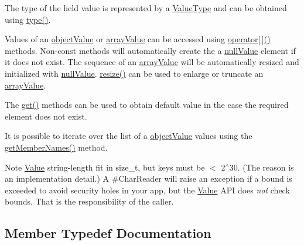 The type of the held value is represented by a \hyperlink{namespaceJson_a7d654b75c16a57007925868e38212b4e}{Value\+Type} and can be obtained using \hyperlink{classJson_1_1Value_a695ef31fad36b4712918b3ff80158479}{type()}.

Values of an \hyperlink{namespaceJson_a7d654b75c16a57007925868e38212b4eae8386dcfc36d1ae897745f7b4f77a1f6}{object\+Value} or \hyperlink{namespaceJson_a7d654b75c16a57007925868e38212b4eadc8f264f36b55b063c78126b335415f4}{array\+Value} can be accessed using \hyperlink{classJson_1_1Value_a7d99f5dba388cdaa152ce6ef933d64ef}{operator\mbox{[}$\,$\mbox{]}()} methods. Non-\/const methods will automatically create the a \hyperlink{namespaceJson_a7d654b75c16a57007925868e38212b4ea7d9899633b4409bd3fc107e6737f8391}{null\+Value} element if it does not exist. The sequence of an \hyperlink{namespaceJson_a7d654b75c16a57007925868e38212b4eadc8f264f36b55b063c78126b335415f4}{array\+Value} will be automatically resized and initialized with \hyperlink{namespaceJson_a7d654b75c16a57007925868e38212b4ea7d9899633b4409bd3fc107e6737f8391}{null\+Value}. \hyperlink{classJson_1_1Value_aa284353271ada427dbfa04a42f2be407}{resize()} can be used to enlarge or truncate an \hyperlink{namespaceJson_a7d654b75c16a57007925868e38212b4eadc8f264f36b55b063c78126b335415f4}{array\+Value}.

The \hyperlink{classJson_1_1Value_a28282c9b76fa031eba7a1843c47c16fe}{get()} methods can be used to obtain default value in the case the required element does not exist.

It is possible to iterate over the list of a \hyperlink{namespaceJson_a7d654b75c16a57007925868e38212b4eae8386dcfc36d1ae897745f7b4f77a1f6}{object\+Value} values using the \hyperlink{classJson_1_1Value_a30fa08af88f2d0a038b22ba9f4e88b2a}{get\+Member\+Names()} method.

\begin{DoxyNote}{Note}
\hyperlink{classJson_1_1Value_ada6ba1369448fb0240bccc36efaa46f7}{Value} string-\/length fit in size\+\_\+t, but keys must be $<$ 2$^\wedge$30. (The reason is an implementation detail.) A \#\+Char\+Reader will raise an exception if a bound is exceeded to avoid security holes in your app, but the \hyperlink{classJson_1_1Value}{Value} A\+PI does {\itshape not} check bounds. That is the responsibility of the caller. 
\end{DoxyNote}


\subsection{Member Typedef Documentation}
